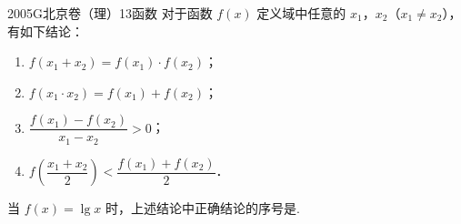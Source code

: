 
\begin{problem}{2005}{G}{北京卷（理）}{13}{函数}
对于函数 $ f(x) $ 定义域中任意的 $ x_1 $，$ x_2 $（$ x_1\ne x_2 $），有如下结论：
\begin{enumerate}
\item $ f(x_1+x_2)=f(x_1)\cdot f(x_2) $；
\item $ f(x_1\cdot x_2)=f(x_1)+f(x_2) $；
\item $ \dfrac{f(x_1)-f(x_2)}{x_1-x_2}>0 $；
\item $ f\left(\dfrac{x_1+x_2}{2}\right)<\dfrac{f(x_1)+f(x_2)}{2} $．
\end{enumerate}
当 $ f(x)=\lg x $ 时，上述结论中正确结论的序号是\underline{\hspace{4em}}.
\end{problem}

\begin{answer}

\end{answer}

\begin{solutions}

\end{solutions}